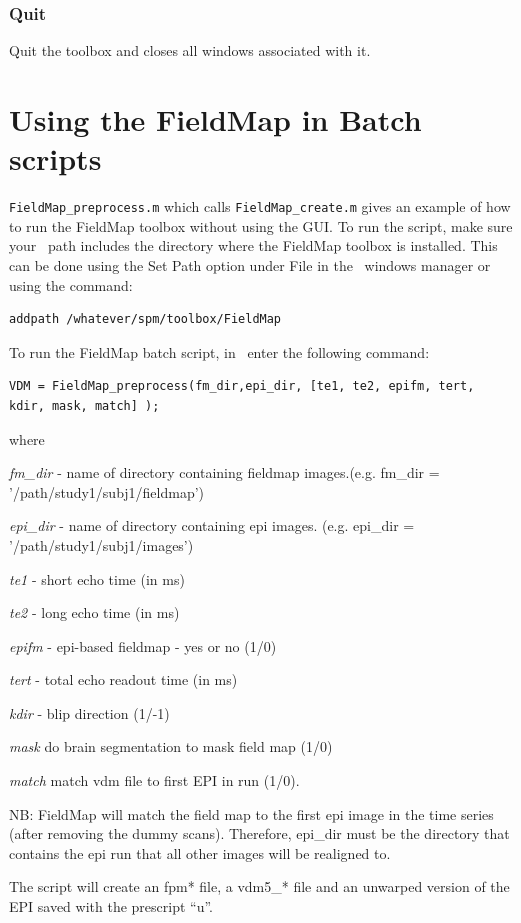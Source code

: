 \subsubsection{Quit}
Quit the toolbox and closes all windows associated with it.


\section{Using the FieldMap in Batch scripts}
\texttt{FieldMap\_preprocess.m} which calls \texttt{FieldMap\_create.m} gives an example of how to run the FieldMap toolbox without using the GUI. To run the script, make sure your \matlab\ path includes the directory where the FieldMap toolbox is installed. This can be done using the Set Path option under File in the \matlab\ windows manager or using the command: 
\begin{verbatim}
addpath /whatever/spm/toolbox/FieldMap
\end{verbatim}

To run the FieldMap batch script, in \matlab\ enter the following command: 
\begin{verbatim}
VDM = FieldMap_preprocess(fm_dir,epi_dir, [te1, te2, epifm, tert, kdir, mask, match] );
\end{verbatim}
where

\emph{fm\_dir} - name of directory containing fieldmap images.(e.g. fm\_dir = '/path/study1/subj1/fieldmap') 

\emph{epi\_dir} - name of directory containing epi images. (e.g. epi\_dir = '/path/study1/subj1/images')

\emph{te1} - short echo time (in ms)

\emph{te2} - long echo time (in ms)

\emph{epifm} - epi-based fieldmap - yes or no (1/0)

\emph{tert} - total echo readout time (in ms)

\emph{kdir} - blip direction (1/-1)

\emph{mask} do brain segmentation to mask field map (1/0)

\emph{match} match vdm file to first EPI in run (1/0).

NB: FieldMap will match the field map to the first epi image in the time series (after removing the dummy scans). Therefore, epi\_dir must be the directory that contains the epi run that all other images will be realigned to.

The script will create an fpm* file, a vdm5\_* file and an unwarped version of the EPI saved with the prescript ``u''.

